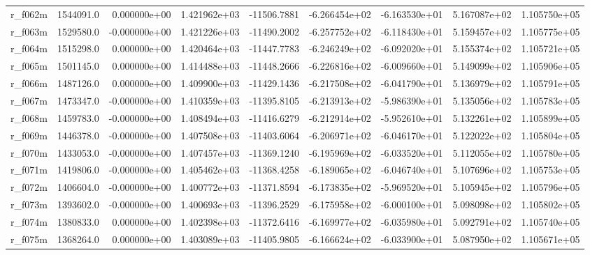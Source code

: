 \documentclass[10pt]{article}
\begin{document}
\begin{landscape}
\begin{longtable}{|l|r|r|r|r|r|r|r|r|}
r\_f062m                 &  1544091.0 &  0.000000e+00 &  1.421962e+03 & -11506.7881 & -6.266454e+02 & -6.163530e+01 &  5.167087e+02 &  1.105750e+05 \\
r\_f063m                 &  1529580.0 & -0.000000e+00 &  1.421226e+03 & -11490.2002 & -6.257752e+02 & -6.118430e+01 &  5.159457e+02 &  1.105775e+05 \\
r\_f064m                 &  1515298.0 &  0.000000e+00 &  1.420464e+03 & -11447.7783 & -6.246249e+02 & -6.092020e+01 &  5.155374e+02 &  1.105721e+05 \\
r\_f065m                 &  1501145.0 &  0.000000e+00 &  1.414488e+03 & -11448.2666 & -6.226816e+02 & -6.009660e+01 &  5.149099e+02 &  1.105906e+05 \\
r\_f066m                 &  1487126.0 &  0.000000e+00 &  1.409900e+03 & -11429.1436 & -6.217508e+02 & -6.041790e+01 &  5.136979e+02 &  1.105791e+05 \\
r\_f067m                 &  1473347.0 & -0.000000e+00 &  1.410359e+03 & -11395.8105 & -6.213913e+02 & -5.986390e+01 &  5.135056e+02 &  1.105783e+05 \\
r\_f068m                 &  1459783.0 & -0.000000e+00 &  1.408494e+03 & -11416.6279 & -6.212914e+02 & -5.952610e+01 &  5.132261e+02 &  1.105899e+05 \\
r\_f069m                 &  1446378.0 & -0.000000e+00 &  1.407508e+03 & -11403.6064 & -6.206971e+02 & -6.046170e+01 &  5.122022e+02 &  1.105804e+05 \\
r\_f070m                 &  1433053.0 & -0.000000e+00 &  1.407457e+03 & -11369.1240 & -6.195969e+02 & -6.033520e+01 &  5.112055e+02 &  1.105780e+05 \\
r\_f071m                 &  1419806.0 & -0.000000e+00 &  1.405462e+03 & -11368.4258 & -6.189065e+02 & -6.046740e+01 &  5.107696e+02 &  1.105753e+05 \\
r\_f072m                 &  1406604.0 & -0.000000e+00 &  1.400772e+03 & -11371.8594 & -6.173835e+02 & -5.969520e+01 &  5.105945e+02 &  1.105796e+05 \\
r\_f073m                 &  1393602.0 & -0.000000e+00 &  1.400693e+03 & -11396.2529 & -6.175958e+02 & -6.000100e+01 &  5.098098e+02 &  1.105802e+05 \\
r\_f074m                 &  1380833.0 &  0.000000e+00 &  1.402398e+03 & -11372.6416 & -6.169977e+02 & -6.035980e+01 &  5.092791e+02 &  1.105740e+05 \\
r\_f075m                 &  1368264.0 &  0.000000e+00 &  1.403089e+03 & -11405.9805 & -6.166624e+02 & -6.033900e+01 &  5.087950e+02 &  1.105671e+05 \\

\end{longtable}
\end{landscape}
\end{document}
